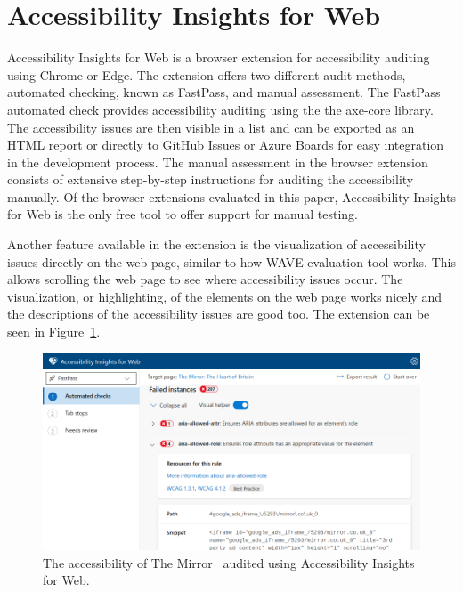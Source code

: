 \section{Accessibility Insights for Web}
Accessibility Insights for Web \parencite{accessibility_insights} is a browser extension for accessibility auditing using Chrome or Edge.
The extension offers two different audit methods, automated checking, known as FastPass, and manual assessment.
The FastPass automated check provides accessibility auditing using the the axe-core library.
The accessibility issues are then visible in a list and can be exported as an HTML report or directly to GitHub Issues or Azure Boards for easy integration in the development process.
The manual assessment in the browser extension consists of extensive step-by-step instructions for auditing the accessibility manually.
Of the browser extensions evaluated in this paper, Accessibility Insights for Web is the only free tool to offer support for manual testing.

Another feature available in the extension is the visualization of accessibility issues directly on the web page, similar to how WAVE evaluation tool works.
This allows scrolling the web page to see where accessibility issues occur.
The visualization, or highlighting, of the elements on the web page works nicely and the descriptions of the accessibility issues are good too. The extension can be seen in Figure~\ref{fig:insights-ext}.


\begin{figure}[tp]
\centering
\includegraphics[keepaspectratio,width=\linewidth,height=\halfh]
{images/insights-ext.png}

\caption[Accessibility Insights for Web]{
The accessibility of The Mirror~\parencite{MirrorUK} audited using Accessibility Insights for Web.
}
\label{fig:insights-ext}
\end{figure}

